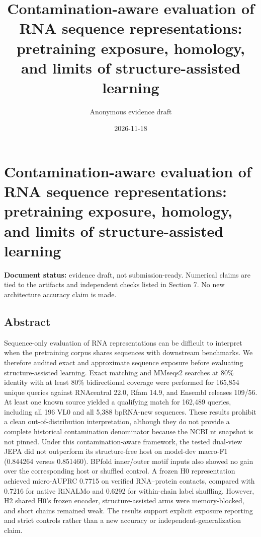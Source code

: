 \documentclass[
  11pt]{article}
\title{Contamination-aware evaluation of RNA sequence representations:
pretraining exposure, homology, and limits of structure-assisted
learning}
\author{Anonymous evidence draft}
\date{2026-11-18}
\begin{document}
\maketitle

\hypertarget{contamination-aware-evaluation-of-rna-sequence-representations-pretraining-exposure-homology-and-limits-of-structure-assisted-learning}{%
\section{Contamination-aware evaluation of RNA sequence representations:
pretraining exposure, homology, and limits of structure-assisted
learning}\label{contamination-aware-evaluation-of-rna-sequence-representations-pretraining-exposure-homology-and-limits-of-structure-assisted-learning}}

\textbf{Document status:} evidence draft, not submission-ready.
Numerical claims are tied to the artifacts and independent checks listed
in Section 7. No new architecture accuracy claim is made.

\hypertarget{abstract}{%
\subsection{Abstract}\label{abstract}}

Sequence-only evaluation of RNA representations can be difficult to
interpret when the pretraining corpus shares sequences with downstream
benchmarks. We therefore audited exact and approximate sequence exposure
before evaluating structure-assisted learning. Exact matching and
MMseqs2 searches at 80\% identity with at least 80\% bidirectional
coverage were performed for 165,854 unique queries against RNAcentral
22.0, Rfam 14.9, and Ensembl releases 109/56. At least one known source
yielded a qualifying match for 162,489 queries, including all 196 VL0
and all 5,388 bpRNA-new sequences. These results prohibit a clean
out-of-distribution interpretation, although they do not provide a
complete historical contamination denominator because the NCBI nt
snapshot is not pinned. Under this contamination-aware framework, the
tested dual-view JEPA did not outperform its structure-free host on
model-dev macro-F1 (0.844264 versus 0.851460). BPfold inner/outer motif
inputs also showed no gain over the corresponding host or shuffled
control. A frozen H0 representation achieved micro-AUPRC 0.7715 on
verified RNA--protein contacts, compared with 0.7216 for native RiNALMo
and 0.6292 for within-chain label shuffling. However, H2 shared H0's
frozen encoder, structure-assisted arms were memory-blocked, and short
chains remained weak. The results support explicit exposure reporting
and strict controls rather than a new accuracy or
independent-generalization claim.
\end{document}
